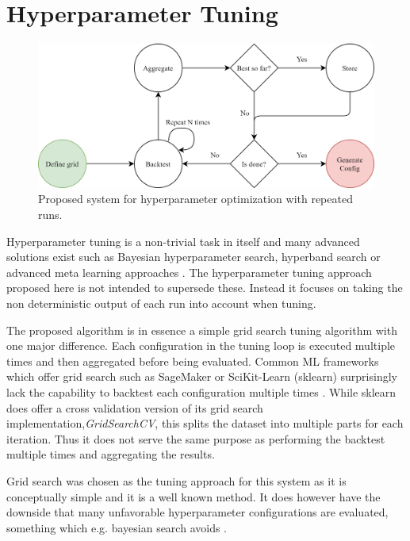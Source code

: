 \section{Hyperparameter Tuning}
\label{sec:hpo}
\begin{figure}[h]
    \centering
    \includegraphics[width=\linewidth]{./img/tuning_overview.png}
    \caption{Proposed system for hyperparameter optimization with repeated runs.}
    \label{fig:proposed_hyperparameter_tuning}
\end{figure}
Hyperparameter tuning is a non-trivial task in itself and many advanced solutions exist such as Bayesian hyperparameter search, hyperband search or advanced meta learning approaches \cite{snoek2012practical,feurer2019hyperparameter, li2017hyperband}. The hyperparameter tuning approach proposed here is not intended to supersede these. Instead it focuses on taking the non deterministic output of each run into account when tuning.

The proposed algorithm is in essence a simple grid search tuning algorithm with one major difference. Each configuration in the tuning loop is executed multiple times and then aggregated before being evaluated. Common ML frameworks which offer grid search such as SageMaker or SciKit-Learn (sklearn) surprisingly lack the capability to backtest each configuration multiple times \cite{sagemaker_website, scikit-learn}. While sklearn does offer a cross validation version of its grid search implementation,\textit{GridSearchCV}, this splits the dataset into multiple parts for each iteration. Thus it does not serve the same purpose as performing the backtest multiple times and aggregating the results.

Grid search was chosen as the tuning approach for this system as it is conceptually simple and it is a well known method. It does however have the downside that many unfavorable hyperparameter configurations are evaluated, something which e.g. bayesian search avoids \cite{snoek2012practical}.

